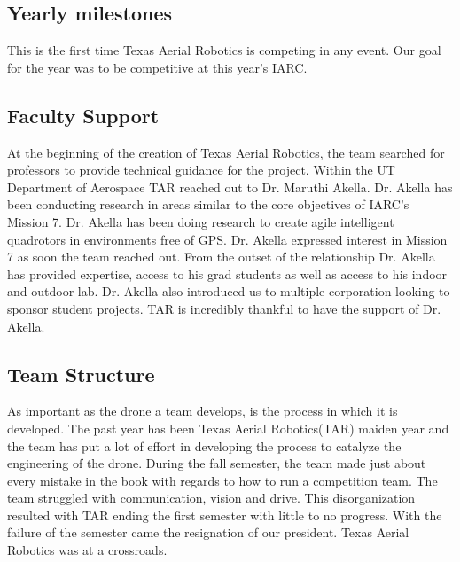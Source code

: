 \documentclass[12pt]{article}
\begin{document}
\subsection{Yearly milestones}
This is the first time Texas Aerial Robotics is competing in any event. Our goal for the year was to be competitive at this year's IARC. 

\subsection{Faculty Support}
At the beginning of the creation of Texas Aerial Robotics, the team searched for professors to provide technical guidance for the project. Within the UT Department of Aerospace TAR reached out to Dr. Maruthi Akella. Dr. Akella has been conducting research in areas similar to the core objectives of IARC’s Mission 7. Dr. Akella has been doing research to create agile intelligent quadrotors in environments free of GPS. Dr. Akella expressed interest in Mission 7 as soon the team reached out. From the outset of the relationship Dr. Akella has provided expertise, access to his grad students as well as access to his indoor and outdoor lab. Dr. Akella also introduced us to multiple corporation looking to sponsor student projects. TAR is incredibly thankful to have the support of Dr. Akella. 

\subsection{Team Structure}
As important as the drone a team develops, is the process in which it is developed. The past year has been Texas Aerial Robotics(TAR) maiden year and the team has put a lot of effort in developing the process to catalyze the engineering of the drone. During the fall semester, the team made just about every mistake in the book with regards to how to run a competition team. The team struggled with communication, vision and drive. This disorganization resulted with TAR ending the first semester with little to no progress. With the failure of the semester came the resignation of our president. Texas Aerial Robotics was at a crossroads. 
\end{document}
